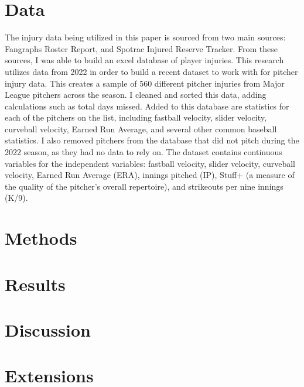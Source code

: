 \documentclass{article}
\begin{document}
\section{Data}
The injury data being utilized in this paper is sourced from two main sources: Fangraphs Roster Report, and Spotrac Injured Reserve Tracker. From these sources, I was able to build an excel database of player injuries. This research utilizes data from 2022 in order to build a recent dataset to work with for pitcher injury data. This creates a sample of 560 different pitcher injuries from Major League pitchers across the season. I cleaned and sorted this data, adding calculations such as total days missed. Added to this database are statistics for each of the pitchers on the list, including fastball velocity, slider velocity, curveball velocity, Earned Run Average, and several other common baseball statistics. I also removed pitchers from the database that did not pitch during the 2022 season, as they had no data to rely on. The dataset contains continuous variables for the independent variables: fastball velocity, slider velocity, curveball velocity, Earned Run Average (ERA), innings pitched (IP), Stuff+ (a measure of the quality of the pitcher's overall repertoire), and strikeouts per nine innings (K/9).

\section{Methods}

\section{Results}

\section{Discussion}

\section{Extensions}
\end{document}
